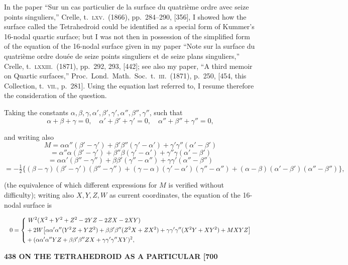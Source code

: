 \documentclass[11pt]{article}
\begin{document}
\medskip

In the paper ``Sur un cas particulier de la surface du quatri\`eme ordre avec seize points singuliers,'' Crelle, t.~\textsc{lxv}.~(1866), pp.~284--290, [356], I showed how the surface called the Tetrahedroid could be identified as a special form of Kummer's 16-nodal quartic surface; but I was not then in possession of the simplified form of the equation of the 16-nodal surface given in my paper ``Note sur la surface du quatri\`eme ordre dou\'ee de seize points singuliers et de seize plans singuliers,'' Crelle, t.~\textsc{lxxiii}.~(1871), pp.~292, 293, [442]; see also my paper, ``A third memoir on Quartic surfaces,'' Proc.~Lond.~Math.~Soc.\ t.~\textsc{iii}.~(1871), p.~250, [454, this Collection, t.~\textsc{vii}., p.~281]. Using the equation last referred to, I resume therefore the consideration of the question.

\medskip

Taking the constants $\alpha, \beta, \gamma, \alpha', \beta', \gamma', \alpha'', \beta'', \gamma''$, such that
\[
\alpha + \beta + \gamma = 0,\quad \alpha' + \beta' + \gamma' = 0,\quad \alpha'' + \beta'' + \gamma'' = 0,
\]

and writing also
\[
M = \alpha\alpha''(\beta'-\gamma') + \beta'\beta''(\gamma'-\alpha') + \gamma'\gamma''(\alpha'-\beta')
\]
\[
= \alpha''\alpha(\beta'-\gamma') + \beta''\beta(\gamma'-\alpha') + \gamma''\gamma(\alpha'-\beta')
\]
\[
= \alpha\alpha'(\beta''-\gamma'') + \beta\beta'(\gamma''-\alpha'') + \gamma\gamma'(\alpha''-\beta'')
\]
\[
= -\tfrac{1}{2}\bigl\{(\beta - \gamma)(\beta'-\gamma')(\beta''-\gamma'') + (\gamma-\alpha)(\gamma'-\alpha')(\gamma''-\alpha'') + (\alpha-\beta)(\alpha'-\beta')(\alpha''-\beta'')\bigr\},
\]

(the equivalence of which different expressions for $M$ is verified without difficulty); writing also $X, Y, Z, W$ as current coordinates, the equation of the 16-nodal surface is

\[
\resizebox{\textwidth}{!}{$\displaystyle
0 = \left\{
\begin{aligned}
&\ W^2(X^2 + Y^2 + Z^2 - 2YZ - 2ZX - 2XY) \\
&+ 2W\bigl[\alpha\alpha'\alpha''(Y^2 Z + YZ^2) + \beta\beta'\beta''(Z^2 X + ZX^2) + \gamma\gamma'\gamma''(X^2 Y + XY^2) + MXYZ\bigr] \\
&+ (\alpha\alpha'\alpha'' YZ + \beta\beta'\beta'' ZX + \gamma\gamma'\gamma'' XY)^2,
\end{aligned}
\right.
$}
\]

\bigskip
\noindent\textbf{438 \hfill ON THE TETRAHEDROID AS A PARTICULAR \hfill [700}
\end{document}
